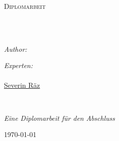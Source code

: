 \documentclass[
11pt, %
ngerman, %
singlespacing, %
liststotoc, %
headsepline, %
]{MastersDoctoralThesis} %
\author{Damian \textsc{Senn}} %
\begin{document}
\frontmatter %

\pagestyle{plain} %


\begin{titlepage}
\begin{center}

\vspace*{.06\textheight}
{\scshape\LARGE \univname\par}\vspace{1.5cm} %
\textsc{\Large Diplomarbeit}\\[0.5cm] %

\HRule \\[0.4cm] %
{\huge \bfseries \ttitle\par}\vspace{0.4cm} %
\HRule \\[1.5cm] %

\begin{minipage}[t]{0.4\textwidth}
\begin{flushleft} \large
\emph{Author:}\\
\href{mailto:damian.senn@gmail.com}{\authorname} %
\end{flushleft}
\end{minipage}
\begin{minipage}[t]{0.4\textwidth}
\begin{flushright} \large
\emph{Experten:} \\
\href{mailto:sandro@bertolino.ch}{\supname}\\
\href{mailto:raez@puzzle.ch}{Severin Räz}
\end{flushright}
\end{minipage}\\[3cm]

\vfill

\large \textit{Eine Diplomarbeit für den Abschluss \degreename}\\[0.3cm] %

\vfill

{\large \today}\\[4cm] %

\vfill
\end{center}
\end{titlepage}
\end{document}
